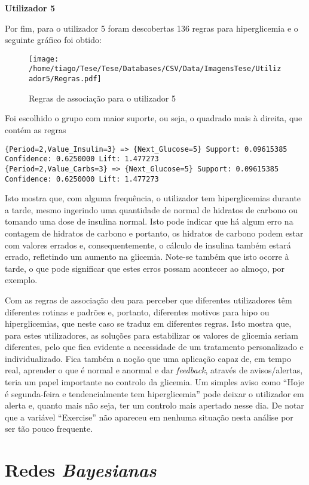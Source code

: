 \textbf{Utilizador 5}

Por fim, para o utilizador 5 foram descobertas 136 regras para hiperglicemia e o seguinte gráfico foi obtido:

\begin{figure}[H]
\centering
\texttt{[image: /home/tiago/Tese/Tese/Databases/CSV/Data/ImagensTese/Utilizador5/Regras.pdf]}
\caption{Regras de associação para o utilizador 5}
\end{figure}
Foi escolhido o grupo com maior suporte, ou seja, o quadrado mais à direita, que contém as regras

\begin{lstlisting}
{Period=2,Value_Insulin=3} => {Next_Glucose=5} Support: 0.09615385  Confidence: 0.6250000 Lift: 1.477273
{Period=2,Value_Carbs=3} => {Next_Glucose=5} Support: 0.09615385  Confidence: 0.6250000 Lift: 1.477273
\end{lstlisting}
Isto mostra que, com alguma frequência, o utilizador tem hiperglicemias durante a tarde, mesmo ingerindo uma quantidade de normal de hidratos de carbono ou tomando uma dose de insulina normal. Isto pode indicar que há algum erro na contagem de hidratos de carbono e portanto, os hidratos de carbono podem estar com valores errados e, consequentemente, o cálculo de insulina também estará errado, refletindo um aumento na glicemia. Note-se também que isto ocorre à tarde, o que pode significar que estes erros possam acontecer ao almoço, por exemplo.\newline

Com as regras de associação deu para perceber que diferentes utilizadores têm diferentes rotinas e padrões e, portanto, diferentes motivos para hipo ou hiperglicemias, que neste caso se traduz em diferentes regras. Isto mostra que, para estes utilizadores, as soluções para estabilizar os valores de glicemia seriam diferentes, pelo que fica evidente a necessidade de um tratamento personalizado e individualizado. Fica também a noção que uma aplicação capaz de, em tempo real, aprender o que é normal e anormal e dar \textit{feedback}, através de avisos/alertas, teria um papel importante no controlo da glicemia. Um simples aviso como ``Hoje é segunda-feira e tendencialmente tem hiperglicemia'' pode deixar o utilizador em alerta e, quanto mais não seja, ter um controlo mais apertado nesse dia.
De notar que a variável ``Exercise'' não apareceu em nenhuma situação nesta análise por ser tão pouco frequente.

\section{Redes \textit{Bayesianas}}

